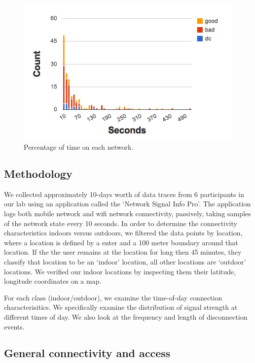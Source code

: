 \begin{figure}[htbp] %
\centering
\includegraphics[width=\columnwidth]{figs/time_hist.png}
\caption{Percentage of time on each network.}
\label{fig:sdh_power}
\end{figure}



\subsection{Methodology}
We collected approximately 10-days worth of data traces from 6 participants in our lab using an application called the 
`Network Signal Info Pro'.  The application logs both mobile network and wifi network connectivity, passively, taking 
samples of the network state every 10 seconds.  In order to determine the connectivity characteristics indoors
versus outdoors, we filtered the data points by location, where a location is defined by a enter and a 100 meter boundary
around that location.  If the the user remains at the location for long then 45 minutes, they classify that location to 
be an `indoor' location, all other locations are `outdoor' locations.  We verified our indoor locations by 
inspecting them their latitude, longitude coordinates on a map.  

For each class (indoor/outdoor), we examine the time-of-day connection characterisitics.  We specifically examine the 
distribution of signal strength at different times of day.  We also look at the frequency and length of disconnection
events.

\subsection{General connectivity and access}

